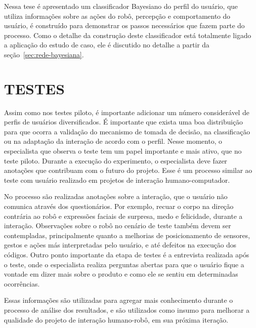 Nessa tese é apresentado um classificador Bayesiano do perfil do usuário, que utiliza informações sobre as ações do robô, percepção e comportamento do usuário, é construído para demonstrar os passos necessários que fazem parte do processo. Como o detalhe da construção deste classificador está totalmente ligado a aplicação do estudo de caso, ele é discutido no detalhe a partir da seção~\ref{sec:rede-bayesiana}.

\section{TESTES}
\label{sec:testes}
Assim como nos testes piloto, é importante adicionar um número considerável de perfis de usuários diversificados. É importante que exista uma boa distribuição para que ocorra a validação do mecanismo de tomada de decisão, na classificação ou na adaptação da interação de acordo com o perfil. Nesse momento, o especialista que observa o teste tem um papel importante e mais ativo, que no teste piloto. Durante a execução do experimento, o especialista deve fazer anotações que contribuam com o futuro do projeto. Esse é um processo similar ao teste com usuário realizado em projetos de interação humano-computador. 

No processo são realizadas anotações sobre a interação, que o usuário não comunica através dos questionários. Por exemplo, recuar o corpo na direção contrária ao robô e expressões faciais de surpresa, medo e felicidade, durante a interação. Observações sobre o robô no cenário de teste também devem ser contempladas, principalmente quanto a melhorias de posicionamento de sensores, gestos e ações más interpretadas pelo usuário, e até defeitos na execução dos códigos. Outro ponto importante da etapa de testes é a entrevista realizada após o teste, onde o especialista realiza perguntas abertas para que o usuário fique a vontade em dizer mais sobre o produto e como ele se sentiu em determinadas ocorrências.

Essas informações são utilizadas para agregar mais conhecimento durante o processo de análise dos resultados, e são utilizados como insumo para melhorar a qualidade do projeto de interação humano-robô, em sua próxima iteração.

